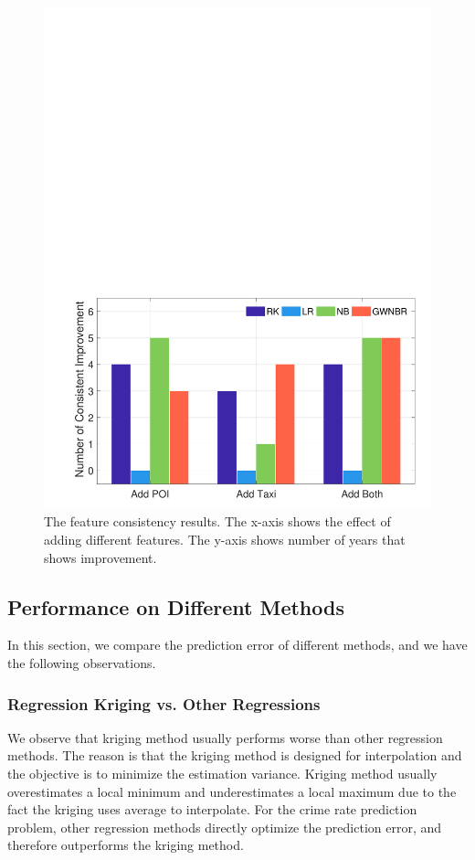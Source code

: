 \begin{figure}[t]
\centering
\includegraphics[width=0.7\linewidth]{fig/feature_consistency.pdf}
\caption{The feature consistency results. The x-axis shows the effect of adding different features. The y-axis shows number of years that shows improvement.}
\label{fig:fcon}
\vspace{-3mm}
\end{figure}




\subsection{Performance on Different Methods}

In this section, we compare the prediction error of different methods, and we have the following observations.

\subsubsection{Regression Kriging vs. Other Regressions}
We observe that kriging method usually performs worse than other regression methods. The reason is that the kriging method is designed for interpolation and the objective is to minimize the estimation variance. Kriging method usually overestimates a local minimum and underestimates a local maximum due to the fact the kriging uses average to interpolate. For the crime rate prediction problem, other regression methods directly optimize the prediction error, and therefore outperforms the kriging method.

